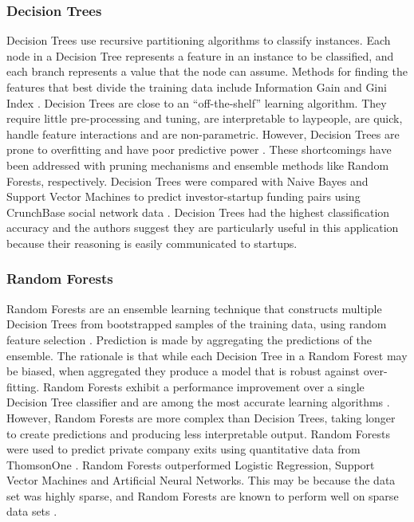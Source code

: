 \documentclass[../thesis/thesis.tex]{subfiles}
\begin{document}
\subsubsection{Decision Trees}

Decision Trees use recursive partitioning algorithms to classify instances. Each node in a Decision Tree represents a feature in an instance to be classified, and each branch represents a value that the node can assume. Methods for finding the features that best divide the training data include Information Gain and Gini Index \cite{mingers1989}. Decision Trees are close to an ``off-the-shelf'' learning algorithm. They require little pre-processing and tuning, are interpretable to laypeople, are quick, handle feature interactions and are non-parametric. However, Decision Trees are prone to overfitting and have poor predictive power \cite{caruana2006}. These shortcomings have been addressed with pruning mechanisms and ensemble methods like Random Forests, respectively. Decision Trees were compared with Naive Bayes and Support Vector Machines to predict investor-startup funding pairs using CrunchBase social network data \cite{liang2016}. Decision Trees had the highest classification accuracy and the authors suggest they are particularly useful in this application because their reasoning is easily communicated to startups.

\subsubsection{Random Forests}

Random Forests are an ensemble learning technique that constructs multiple Decision Trees from bootstrapped samples of the training data, using random feature selection \cite{breiman2001}. Prediction is made by aggregating the predictions of the ensemble. The rationale is that while each Decision Tree in a Random Forest may be biased, when aggregated they produce a model that is robust against over-fitting.  Random Forests exhibit a performance improvement over a single Decision Tree classifier and are among the most accurate learning algorithms \cite{caruana2006}.  However, Random Forests are more complex than Decision Trees, taking longer to create predictions and producing less interpretable output. Random Forests were used to predict private company exits using quantitative data from ThomsonOne \cite{bhat2011}. Random Forests outperformed Logistic Regression, Support Vector Machines and Artificial Neural Networks. This may be because the data set was highly sparse, and Random Forests are known to perform well on sparse data sets \cite{breiman2001}.
\end{document}
